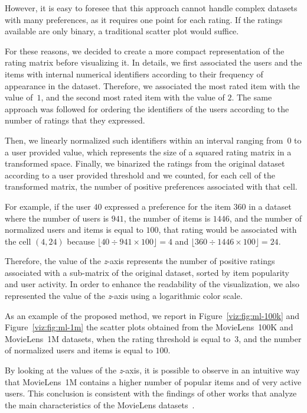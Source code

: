 However, it is easy to foresee that this approach cannot handle complex datasets with many preferences, as it requires one point for each rating. If the ratings available are only binary, a traditional scatter plot would suffice.

For these reasons, we decided to create a more compact representation of the rating matrix before visualizing it. In details, we first associated the users and the items with internal numerical identifiers according to their frequency of appearance in the dataset. Therefore, we associated the most rated item with the value of~$1$, and the second most rated item with the value of $2$. The same approach was followed for ordering the identifiers of the users according to the number of ratings that they expressed.

Then, we linearly normalized such identifiers within an interval ranging from~$0$ to a user provided value, which represents the size of a squared rating matrix in a transformed space. Finally, we binarized the ratings from the original dataset according to a user provided threshold and we counted, for each cell of the transformed matrix, the number of positive preferences associated with that cell.

For example, if the user $40$ expressed a preference for the item $360$ in a dataset where the number of users is $941$, the number of items is $1446$, and the number of normalized users and items is equal to $100$, that rating would be associated with the cell $(4, 24)$ because $\lfloor 40 \div 941 \times 100 \rfloor = 4$ and $\lfloor 360 \div 1446 \times 100 \rfloor = 24$.

Therefore, the value of the \textit{z}-axis represents the number of positive ratings associated with a sub-matrix of the original dataset, sorted by item popularity and user activity. In order to enhance the readability of the visualization, we also represented the value of the \textit{z}-axis using a logarithmic color scale.

As an example of the proposed method, we report in Figure~\ref{viz:fig:ml-100k} and Figure~\ref{viz:fig:ml-1m} the scatter plots obtained from the MovieLens~100K and MovieLens~1M datasets, when the rating threshold is equal to~$3$, and the number of normalized users and items is equal to $100$.

By looking at the values of the \textit{z}-axis, it is possible to observe in an intuitive way that MovieLens~1M contains a higher number of popular items and of very active users. This conclusion is consistent with the findings of other works that analyze the main characteristics of the MovieLens datasets~\cite{Cremonesi2010}.


